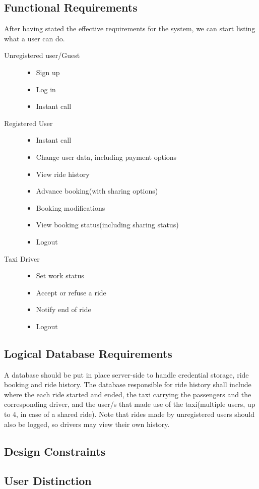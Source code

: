 \subsection{Functional Requirements}
	After having stated the effective requirements for the system, we can start listing what a user can do.
		\begin{description}
		\item[Unregistered user/Guest] \hfill
			\begin{itemize}
				\item Sign up
				\item Log in
				\item Instant call
			\end{itemize}
		\item[Registered User] \hfill
			\begin{itemize}
				\item Instant call
				\item Change user data, including payment options
				\item View ride history
				\item Advance booking(with sharing options)
				\item Booking modifications
				\item View booking status(including sharing status)
				\item Logout
			\end{itemize}
		\item[Taxi Driver] \hfill
			\begin{itemize}
				\item Set work status
				\item Accept or refuse a ride
				\item Notify end of ride
				\item Logout
			\end{itemize}
		\end{description}
\newpage
\subsection{Logical Database Requirements}
	A database should be put in place server-side to handle credential storage, ride booking and ride history. The database responsible for ride history
	shall include where the each ride started and ended, the taxi carrying the passengers and the corresponding driver, and the user/s that made use of the
	taxi(multiple users, up to 4, in case of a shared ride). Note that rides made by unregistered users should also be logged, so drivers may view their own history.
\subsection{Design Constraints}
	
\subsection{User Distinction}

